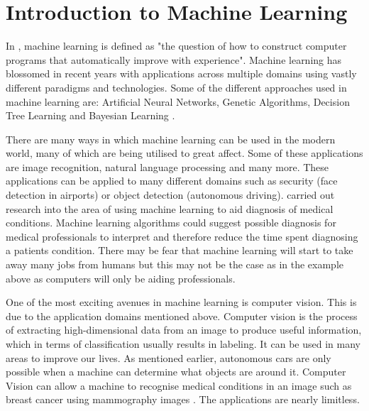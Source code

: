 \section{Introduction to Machine Learning}
In \parencite{MLANN}, machine learning is defined as "the question of how to
construct computer programs that automatically improve with experience".
Machine learning has blossomed in recent years with applications across multiple
domains using vastly different paradigms and technologies. 
Some of the different approaches used in machine learning are: Artificial Neural Networks, Genetic Algorithms, Decision Tree Learning and Bayesian Learning \parencite{MLANN}.

There are many ways in which machine learning can be used in the modern world,
many of which are being utilised to great affect.
Some of these applications are image recognition, natural language
processing and many more.
These applications can be applied to many different domains such as security (face detection in airports) or object detection (autonomous driving).
\parencite{medical} carried out research into the area of using machine learning to aid diagnosis of medical conditions.
Machine learning algorithms could suggest possible diagnosis for medical professionals to interpret and therefore reduce the time spent diagnosing a patients condition.
There may be fear that machine learning will start to take away many jobs
from
humans but this may not be the case as in the example above as computers will only be aiding professionals.

One of the most exciting avenues in machine learning is computer
vision.
This is due to the application domains mentioned above. 
Computer vision is the process of extracting high-dimensional data from an image to produce useful information, which in terms of classification usually results in labeling. It can be used in many areas to improve our lives. As
mentioned earlier, autonomous cars are only possible when a machine can
determine what objects are around it. Computer Vision can allow a machine to
recognise medical conditions in an image such as breast cancer using mammography images \parencite{medical}. The applications are nearly limitless.